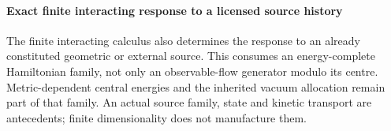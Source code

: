 \documentclass[12pt,a4paper]{article}
\begin{document}
\paragraph{Exact finite interacting response to a licensed source history}
\label{p4:sec:v4104-finite-source-response}

The finite interacting calculus also determines the response to an already
constituted geometric or external source.  This consumes an energy-complete
Hamiltonian family, not only an observable-flow generator modulo its centre.
Metric-dependent central energies and the inherited vacuum allocation remain
part of that family.  An actual source family, state and kinetic transport are
antecedents; finite dimensionality does not manufacture them.
\end{document}
